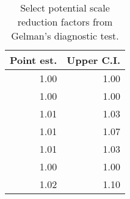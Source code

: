 \begin{table}[h]
\centering
\begin{tabular}{rr}
  \hline
Point est. & Upper C.I. \\ 
  \hline
1.00 & 1.00 \\ 
  1.00 & 1.00 \\ 
  1.01 & 1.03 \\ 
  1.01 & 1.07 \\ 
  1.01 & 1.03 \\ 
  1.00 & 1.00 \\ 
  1.02 & 1.10 \\ 
   \hline
\end{tabular}
\caption{Select potential scale reduction factors from Gelman's diagnostic test.} 
\label{tab:gelman}
\end{table}

